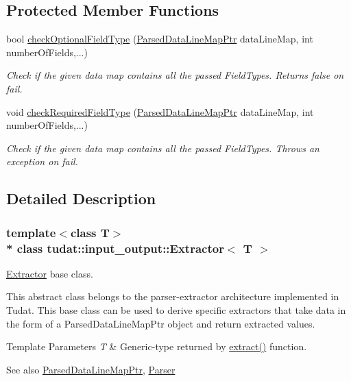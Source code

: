\subsection*{Protected Member Functions}
\begin{DoxyCompactItemize}
\item 
bool \hyperlink{classtudat_1_1input__output_1_1Extractor_aa8b4479a4ea688d31ca0887a7ea8cacc}{check\+Optional\+Field\+Type} (\hyperlink{classtudat_1_1input__output_1_1Extractor_abfff04b61512a08b822cbcecb6613253}{Parsed\+Data\+Line\+Map\+Ptr} data\+Line\+Map, int number\+Of\+Fields,...)
\begin{DoxyCompactList}\small\item\em Check if the given data map contains all the passed Field\+Types. Returns false on fail. \end{DoxyCompactList}\item 
void \hyperlink{classtudat_1_1input__output_1_1Extractor_aca0c1f90a927a7e4413cb06d24e12966}{check\+Required\+Field\+Type} (\hyperlink{classtudat_1_1input__output_1_1Extractor_abfff04b61512a08b822cbcecb6613253}{Parsed\+Data\+Line\+Map\+Ptr} data\+Line\+Map, int number\+Of\+Fields,...)
\begin{DoxyCompactList}\small\item\em Check if the given data map contains all the passed Field\+Types. Throws an exception on fail. \end{DoxyCompactList}\end{DoxyCompactItemize}


\subsection{Detailed Description}
\subsubsection*{template$<$class T$>$\\*
class tudat\+::input\+\_\+output\+::\+Extractor$<$ T $>$}

\hyperlink{classtudat_1_1input__output_1_1Extractor}{Extractor} base class. 

This abstract class belongs to the parser-\/extractor architecture implemented in Tudat. This base class can be used to derive specific extractors that take data in the form of a Parsed\+Data\+Line\+Map\+Ptr object and return extracted values. 
\begin{DoxyTemplParams}{Template Parameters}
{\em T} & Generic-\/type returned by \hyperlink{classtudat_1_1input__output_1_1Extractor_a702e1c0f4ffc78cad05c1005e3755e94}{extract()} function. \\
\hline
\end{DoxyTemplParams}
\begin{DoxySeeAlso}{See also}
\hyperlink{classtudat_1_1input__output_1_1Extractor_abfff04b61512a08b822cbcecb6613253}{Parsed\+Data\+Line\+Map\+Ptr}, \hyperlink{classtudat_1_1input__output_1_1Parser}{Parser} 
\end{DoxySeeAlso}


